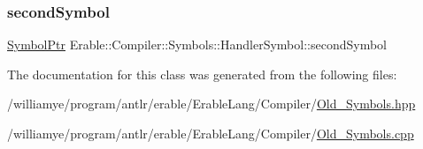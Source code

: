 \subsubsection{\texorpdfstring{secondSymbol}{secondSymbol}}
{\footnotesize\ttfamily \mbox{\hyperlink{namespace_erable_1_1_compiler_1_1_symbols_a8f0bc762f448ea4d84e8713ab3e140b9}{Symbol\+Ptr}} Erable\+::\+Compiler\+::\+Symbols\+::\+Handler\+Symbol\+::second\+Symbol}



The documentation for this class was generated from the following files\+:\begin{DoxyCompactItemize}
\item 
/williamye/program/antlr/erable/\+Erable\+Lang/\+Compiler/\mbox{\hyperlink{_old___symbols_8hpp}{Old\+\_\+\+Symbols.\+hpp}}\item 
/williamye/program/antlr/erable/\+Erable\+Lang/\+Compiler/\mbox{\hyperlink{_old___symbols_8cpp}{Old\+\_\+\+Symbols.\+cpp}}\end{DoxyCompactItemize}
